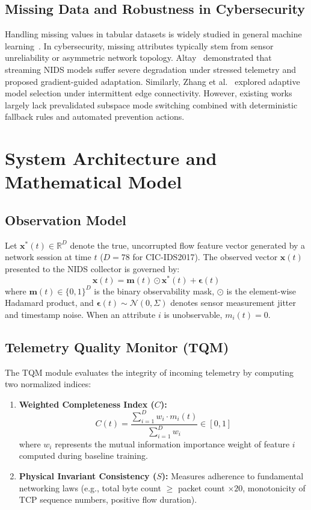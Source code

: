 \documentclass[conference]{IEEEtran}
\begin{document}
\subsection{Missing Data and Robustness in Cybersecurity}
Handling missing values in tabular datasets is widely studied in general machine learning~\cite{yoon2018gain}. In cybersecurity, missing attributes typically stem from sensor unreliability or asymmetric network topology. Altay~\cite{altay2026gradient} demonstrated that streaming NIDS models suffer severe degradation under stressed telemetry and proposed gradient-guided adaptation. Similarly, Zhang et al.~\cite{zhang2025adaptive} explored adaptive model selection under intermittent edge connectivity. However, existing works largely lack prevalidated subspace mode switching combined with deterministic fallback rules and automated prevention actions.

\section{System Architecture and Mathematical Model}

\subsection{Observation Model}
Let $\mathbf{x}^*(t) \in \mathbb{R}^D$ denote the true, uncorrupted flow feature vector generated by a network session at time $t$ ($D=78$ for CIC-IDS2017). The observed vector $\mathbf{x}(t)$ presented to the NIDS collector is governed by:
\begin{equation}
    \mathbf{x}(t) = \mathbf{m}(t) \odot \mathbf{x}^*(t) + \boldsymbol{\epsilon}(t)
\end{equation}
where $\mathbf{m}(t) \in \{0, 1\}^D$ is the binary observability mask, $\odot$ is the element-wise Hadamard product, and $\boldsymbol{\epsilon}(t) \sim \mathcal{N}(0, \Sigma)$ denotes sensor measurement jitter and timestamp noise. When an attribute $i$ is unobservable, $m_i(t) = 0$.

\subsection{Telemetry Quality Monitor (TQM)}
The TQM module evaluates the integrity of incoming telemetry by computing two normalized indices:
\begin{enumerate}
    \item \textbf{Weighted Completeness Index ($C$):}
    \begin{equation}
        C(t) = \frac{\sum_{i=1}^D w_i \cdot m_i(t)}{\sum_{i=1}^D w_i} \in [0, 1]
    \end{equation}
    where $w_i$ represents the mutual information importance weight of feature $i$ computed during baseline training.
    \item \textbf{Physical Invariant Consistency ($S$):} Measures adherence to fundamental networking laws (e.g., total byte count $\ge$ packet count $\times 20$, monotonicity of TCP sequence numbers, positive flow duration).
\end{enumerate}
\end{document}
